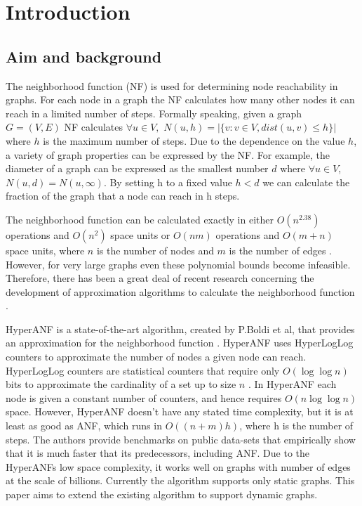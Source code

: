 \chapter{Introduction}

\section{Aim and background}
The neighborhood function (NF) is used for determining node reachability in graphs. For each node in a graph the NF calculates how many other nodes it can reach in a limited number of steps. Formally speaking, given a graph $G = (V,E)$ NF calculates $\forall u \in V,$ $N(u,h) = |\{v : v \in V, dist(u,v) \leq h \}|$ where $h$ is the maximum number of steps. Due to the dependence on the value $h$, a variety of graph properties can be expressed by the NF. For example, the diameter of a graph can be expressed as the smallest number $d$ where $ \forall u \in V$, $N(u,d) = N(u,\infty)$. By setting h to a fixed value $h < d$ we can calculate the fraction of the graph that a node can reach in h steps. 

The neighborhood function can be calculated exactly in either $O(n^{2.38})$ operations and $O(n^2)$ space units or $O(nm)$ operations and $O(m + n)$ space units, where $n$ is the number of nodes and $m$ is the number of edges \cite{Palmer01}. However, for very large graphs even these polynomial bounds become infeasible. Therefore, there has been a great deal of recent research concerning the development of approximation algorithms to calculate the neighborhood function \cite{Palmer01,anf,hyperanf}. 

HyperANF is a state-of-the-art algorithm, created by P.Boldi et al, that provides an approximation for the neighborhood function \cite{hyperanf}. HyperANF uses HyperLogLog counters to approximate the number of nodes a given node can reach. HyperLogLog counters are statistical counters that require only $O( \log\log n)$ bits to approximate the cardinality of a set up to size $n$ \cite{hyperloglog}. In HyperANF each node is given a constant number of counters, and hence requires $O(n \log\log n)$ space. However, HyperANF doesn't have any stated time complexity, but it is at least as good as ANF, which runs in $O((n+m)h)$, where h is the number of steps. The authors provide benchmarks on public data-sets that empirically show that it is much faster that its predecessors, including ANF. Due to the HyperANFs low space complexity, it works well on graphs with number of edges at the scale of billions. Currently the algorithm supports only static graphs. This paper aims to extend the existing algorithm to support dynamic graphs.

